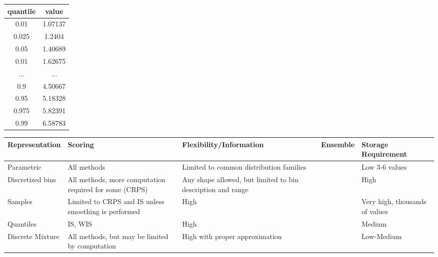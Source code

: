\documentclass{article}\usepackage[]{graphicx}\usepackage[]{color}
\begin{document}
\begin{table}[h!]
\centering
 \begin{tabular}{|c|c|} 
 \hline
    quantile & value \\ \hline
    0.01 & 1.07137 \\
    0.025 & 1.2404 \\
    0.05 & 1.40689 \\
    0.01 & 1.62675 \\
    ...  & ... \\
    0.9 & 4.50667 \\
    0.95 & 5.18328 \\
    0.975 & 5.82391 \\
    0.99 & 6.58783 \\
 \hline
 \end{tabular}
\end{table}


\begin{flushleft}
    \begin{adjustwidth}{-3cm}{-1cm}
    \begin{tabular}{ | p{2.4cm} | p{2cm} | p{4cm} | p{3cm} | l |}
    \hline
    Representation & Scoring & Flexibility/Information & Ensemble &
    Storage Requirement
    \\ \hline

    Parametric & All methods & Limited to common distribution families 
    &  & Low 3-6 values \\ \hline
    
    Discretized bins & All methods, more computation required for some (CRPS) &
    Any shape allowed, but limited to bin description and range & &
    High
    \\ \hline

    Samples & Limited to CRPS and IS unless smoothing is performed & High & & 
    Very high, thousands of values
    \\ \hline

    
    Quantiles & IS, WIS & High & & Medium 
    \\ \hline
    
    Discrete Mixture & All methods, but may be limited by computation & 
    High with proper approximation &
    & Low-Medium
    \\ \hline

	 \end{tabular}
	 \end{adjustwidth}
\end{flushleft}

\end{document}
